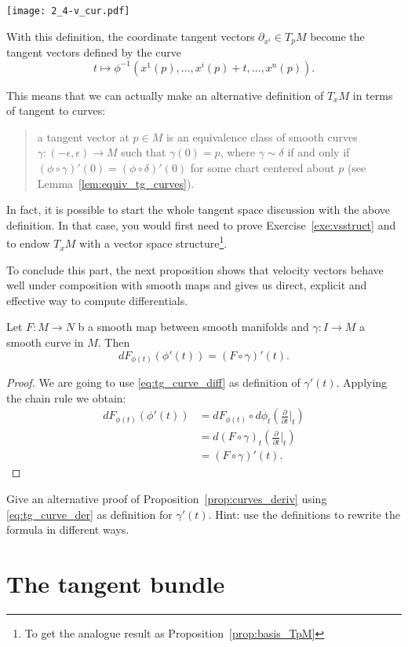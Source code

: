 \begin{marginfigure}
    \texttt{[image: 2\_4-v\_cur.pdf]}
    \caption{With this definition, the coordinate tangent vectors $\partial_{x^i}\in T_p M$ become the tangent vectors defined by the curve \[t \mapsto \phi^{-1}(x^1(p), \ldots, {x^i(p) + t}, \ldots, x^n(p)).\]}
    \label{fig:2_4-v_cur}
\end{marginfigure}
This means that we can actually make an alternative definition of $T_xM$ in terms of tangent to curves:
\begin{quote}
    a tangent vector at $p\in M$ is an equivalence class of smooth curves $\gamma:(-\epsilon, \epsilon)\to M$ such that $\gamma(0)=p$, where $\gamma\sim\delta$ if and only if $(\phi\circ \gamma)'(0) = (\phi\circ\delta)'(0)$ for some chart centered about $p$ (see Lemma~\ref{lem:equiv_tg_curves}).
\end{quote}

In fact, it is possible to start the whole tangent space discussion with the above definition. In that case, you would first need to prove Exercise~\ref{exe:vsstruct} and to endow $T_xM$ with a vector space structure\footnote{To get the analogue result as Proposition~\ref{prop:basis_TpM}}.

To conclude this part, the next proposition shows that velocity vectors behave well under composition with smooth maps and gives us direct, explicit and effective way to compute differentials.

\begin{prop}\label{prop:curves_deriv}
    Let $F:M\to N$ b a smooth map between smooth manifolds and $\gamma:I\to M$ a smooth curve in $M$.
    Then
    \begin{equation}
        d F_{\phi(t)} (\phi'(t)) = (F\circ\gamma)'(t).
    \end{equation}
\end{prop}
\begin{proof}
    We are going to use \eqref{eq:tg_curve_diff} as definition of $\gamma'(t)$.
    Applying the chain rule we obtain:
    \begin{align}
        d F_{\phi(t)} (\phi'(t))
        &= d F_{\phi(t)} \circ d\phi_t \left(\frac{\partial}{\partial t}\Big|_t\right) \\
        &= d (F\circ\gamma)_t \left(\frac{\partial}{\partial t}\Big|_t\right) \\
        &= (F\circ\gamma)'(t).
    \end{align}
\end{proof}

\begin{exe}
    Give an alternative proof of Proposition~\ref{prop:curves_deriv} using \eqref{eq:tg_curve_der} as definition for $\gamma'(t)$.
    Hint: use the definitions to rewrite the formula in different ways.
\end{exe}


\section{The tangent bundle}